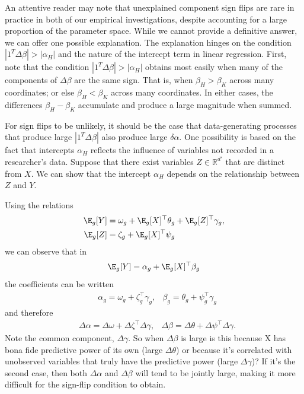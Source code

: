 An attentive reader may note that unexplained component sign flips are rare in practice in both of our empirical investigations, despite accounting for a large proportion of the parameter space.
While we cannot provide a definitive answer, we can offer one possible explanation.
The explanation hinges on the condition \( | 1^T \Delta \beta | > |\alpha_H| \) and the nature of the intercept term in linear regression.
First, note that the condition \( | 1^T \Delta \beta | > |\alpha_H| \) obtains most easily when many of the components of \( \Delta \beta \) are the same sign.
That is, when \( \beta_H > \beta_K \) across many coordinates; or else \( \beta_H < \beta_K \) across many coordinates.
In either cases, the differences \( \beta_H - \beta_K \) accumulate and produce a large magnitude when summed.

For sign flips to be unlikely, it should be the case that data-generating processes that produce large \( | 1^T \Delta \beta | \) also produce large \( \delta \alpha \).
One possibility is based on the fact that intercepts \( \alpha_H \) reflects the influence of variables not recorded in a researcher's data.
Suppose that there exist variables \( Z \in \mathbb{R}^{d'} \) that are distinct from \( X \).
We can show that the intercept \( \alpha_H \) depends on the relationship between \( Z \) and \( Y \).

Using the relations
\begin{align*}
   \E_g[Y] &= \omega_g + \E_g[X]^\top \theta_g + \E_g[Z]^\top \gamma_g, \\    
   \E_g[Z] &= \zeta_g + \E_g[X]^\top \psi_g 
\end{align*}
we can observe that in 
\[ \E_g[Y] = \alpha_g + \E_g[X]^\top \beta_g \]
the coefficients can be written
\begin{align*}    
   &\alpha_g = \omega_g + \zeta_g^\top \gamma_g,
   &\beta_g  = \theta_g +\psi_g^\top \gamma_g
\end{align*}
and therefore 
\begin{align*}
  &\Delta \alpha = \Delta \omega + \Delta \zeta^\top \Delta \gamma,
  &\Delta \beta  = \Delta \theta + \Delta \psi^\top \Delta \gamma.
\end{align*}
Note the common component, \( \Delta \gamma \).
So when \( \Delta \beta \) is large is this because X has bona fide predictive power of its own (large \( \Delta \theta  \)) or because it's correlated with unobserved variables that truly have the predictive power (large \( \Delta \gamma \))?
If it's the second case, then both \( \Delta \alpha \) and \( \Delta \beta \) will tend to be jointly large, making it more difficult for the sign-flip condition to obtain.

